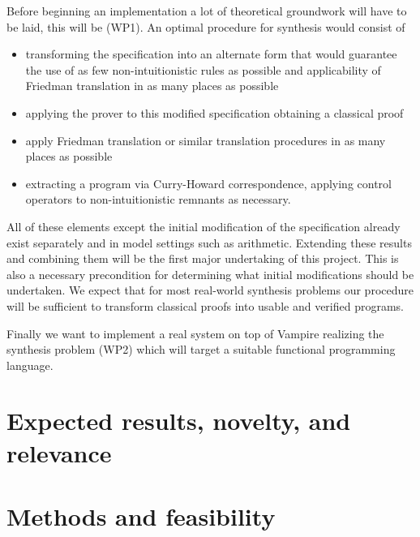 \documentclass[a4paper,12pt]{article}
\begin{document}
	Before beginning an implementation a lot of theoretical groundwork will have to be laid, this will be (WP1). An optimal procedure for synthesis would consist of
	\begin{itemize}
		\item transforming the specification into an alternate form that would guarantee the use of as few non-intuitionistic rules as possible and applicability of Friedman translation in as many places as possible
		\item applying the prover to this modified specification obtaining a classical proof
		\item apply Friedman translation or similar translation procedures in as many places as possible
		\item extracting a program via Curry-Howard correspondence, applying control operators to non-intuitionistic remnants as necessary.
	\end{itemize}
	All of these elements except the initial modification of the specification already exist separately and in model settings such as arithmetic. Extending these results and combining them will be the first major undertaking of this project. This is also a necessary precondition for determining what initial modifications should be undertaken. We expect that for most real-world synthesis problems our procedure will be sufficient to transform classical proofs into usable and verified programs.
	
	Finally we want to implement a real system on top of Vampire realizing the synthesis problem (WP2) which will target a suitable functional programming language.
	
	\section{Expected results, novelty, and relevance}

	
	

	\section{Methods and feasibility}
	
\end{document}
